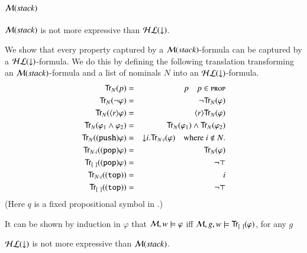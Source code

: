 \section{$\mathcal{M}(stack)$}

\begin{pro}\label{prop:stack_leq_hl}
$\mathcal{M}(stack)$ is not more expressive than $\mathcal{HL}({\downarrow})$.
\end{pro}

\begin{pf}
We show that every property captured by a $\mathcal{M}(stack)$-formula can be
captured by a $\mathcal{HL}({\downarrow})$-formula. We do this by defining the
following translation transforming an $\mathcal{M}(stack)$-formula and a list of
nominals $N$ into an $\mathcal{HL}({\downarrow})$-formula.
\begin{eqnarray*}
{\sf Tr}_N(p) & = & p \quad p \in \textsc{prop}\\
{\sf Tr}_N(\lnot \varphi) & = & \lnot {\sf Tr}_N(\varphi) \\
{\sf Tr}_N(\langle r \rangle \varphi) & = & \langle r \rangle {\sf Tr}_N(\varphi) \\
{\sf Tr}_N(\varphi_1 \land \varphi_2) & = & {\sf Tr}_N(\varphi_1) \land {\sf Tr}_N(\varphi_2)\\
{\sf Tr}_N({\tt (push)} \varphi) & = & {\downarrow} i. {\sf Tr}_{N\cdot i}(\varphi) \quad
\textrm{where $i \notin N$.}\\
{\sf Tr}_{N\cdot i}({\tt (pop)} \varphi) & = & {\sf Tr}_{N}(\varphi)\\
{\sf Tr}_{[\ ]}({\tt (pop)} \varphi) & = & \lnot\top\\
{\sf Tr}_{N\cdot i}({\tt (top)}) & = & i\\
{\sf Tr}_{[\ ]}({\tt (top)}) & = & \lnot\top
\end{eqnarray*}
(Here $q$ is a fixed propositional symbol in \prop.)

It can be shown by induction in $\varphi$ that $\mathcal{M}, w \models
\varphi$ iff $\mathcal{M}, g, w \models {\sf Tr}_{[\ ]}(\varphi)$, for any $g$
\end{pf}

\begin{pro} \label{prop:hl_leq_stack}
$\mathcal{HL}({\downarrow})$ is not more expressive than $\mathcal{M}(stack)$.
\end{pro}

